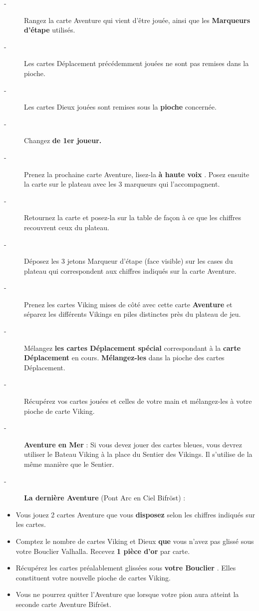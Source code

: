 \documentclass{scrartcl}%
\begin{document}
%
\begin{description}%
\item[{-} ]%
%
 Rangez la carte Aventure qui vient d'être jouée, ainsi que les %
\textbf{Marqueurs d'étape}%
\textit{ }%
 utilisés.
%
\item[{-} ]%
%
 Les cartes Déplacement précédemment jouées ne sont pas remises dans la pioche.
%
\item[{-} ]%
%
 Les cartes Dieux jouées sont remises sous la %
\textbf{pioche}%
\textit{ }%
 concernée.
%
\item[{-} ]%
%
 Changez %
\textbf{de 1er joueur.}%

%
\item[{-} ]%
%
 Prenez la prochaine carte Aventure, lisez{-}la %
\textbf{à haute voix}%
. Posez ensuite la carte sur le plateau avec les 3 marqueurs qui l'accompagnent.
%
\item[{-} ]%
%
 Retournez la carte et posez{-}la sur la table de façon à ce que les chiffres recouvrent ceux du plateau.
%
\item[{-} ]%
%
 Déposez les 3 jetons Marqueur d'étape (face visible) sur les cases du plateau qui correspondent aux chiffres indiqués sur la carte Aventure.
%
\item[{-} ]%
%
 Prenez les cartes Viking mises de côté avec cette carte %
\textbf{Aventure}%
\textit{ }%
 et séparez les différents Vikings en piles distinctes près du plateau de jeu.
%
\item[{-} ]%
%
 Mélangez %
\textbf{les cartes Déplacement spécial}%
\textit{ }%
 correspondant à la %
\textbf{carte Déplacement}%
\textit{ }%
 en cours. %
\textbf{Mélangez{-}les}%
\textit{ }%
 dans la pioche des cartes Déplacement.
%
\item[{-} ]%
%
 Récupérez vos cartes jouées et celles de votre main et mélangez{-}les à votre pioche de carte Viking.
%
\item[{-} ]%
%
\textbf{Aventure en Mer }%
: Si vous devez jouer des cartes bleues, vous devrez utiliser le Bateau Viking à la place du Sentier des Vikings. Il s'utilise de la même manière que le Sentier.
%
\item[{-} ]%
%
\textbf{La dernière Aventure}%
\textit{ }%
 (Pont Arc en Ciel Bifröst) :
%
\end{description}%
\begin{itemize}%
\item%
%
 Vous jouez 2 cartes Aventure que vous %
\textbf{disposez}%
\textit{ }%
 selon les chiffres indiqués sur les cartes.
%
\item%
%
 Comptez le nombre de cartes Viking et Dieux %
\textbf{que}%
\textit{ }%
 vous n'avez pas glissé sous votre Bouclier Valhalla. Recevez %
\textbf{1 pièce d'or}%
\textit{ }%
 par carte.
%
\item%
%
 Récupérez les cartes préalablement glissées sous %
\textbf{votre Bouclier}%
. Elles constituent votre nouvelle pioche de cartes Viking.
%
\item%
%
 Vous ne pourrez quitter l'Aventure que lorsque votre pion aura atteint la seconde carte Aventure Bifröst.
%
\end{itemize}
\end{document}
